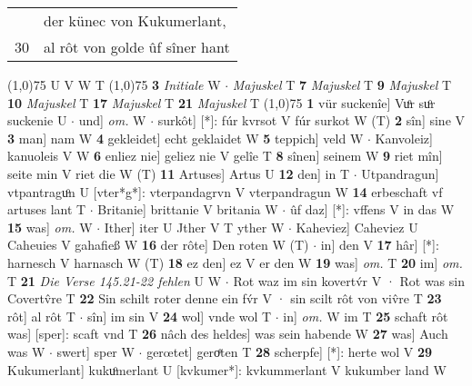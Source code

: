 \documentclass[8pt,a4paper,notitlepage]{article}
\begin{document}
\begin{table}[ht]
\begin{minipage}[t]{0.5\linewidth}
\begin{tabular}{rl}
 & der künec von Kukumerlant,\\ 
30 & al rôt von golde ûf sîner hant\\ 
\end{tabular}
\scriptsize
\line(1,0){75} \newline
U V W T \newline
\line(1,0){75} \newline
\textbf{3} \textit{Initiale} W   $\cdot$ \textit{Majuskel} T  \textbf{7} \textit{Majuskel} T  \textbf{9} \textit{Majuskel} T  \textbf{10} \textit{Majuskel} T  \textbf{17} \textit{Majuskel} T  \textbf{21} \textit{Majuskel} T  \newline
\line(1,0){75} \newline
\textbf{1} vür suckenîe] Vuͦr suͦr suckenie U  $\cdot$ und] \textit{om.} W  $\cdot$ surkôt] [*]: fúr kvrsot V fúr surkot W (T) \textbf{2} sîn] sine V \textbf{3} man] nam W \textbf{4} gekleidet] echt geklaidet W \textbf{5} teppich] veld W  $\cdot$ Kanvoleiz] kanuoleis V W \textbf{6} enliez nie] geliez nie V gelîe T \textbf{8} sînen] seinem W \textbf{9} riet mîn] seite min V riet die W (T) \textbf{11} Artuses] Artus U \textbf{12} den] in T  $\cdot$ Utpandragun] vtpantraguͦn U [vter*g*]: vterpandagrvn V vterpandragun W \textbf{14} erbeschaft vf artuses lant T  $\cdot$ Britanie] brittanie V britania W  $\cdot$ ûf daz] [*]: vffens V in das W \textbf{15} was] \textit{om.} W  $\cdot$ Ither] iter U Jther V T yther W  $\cdot$ Kaheviez] Caheviez U Caheuies V gahafieß W \textbf{16} der rôte] Den roten W (T)  $\cdot$ in] den V \textbf{17} hâr] [*]: harnesch V harnasch W (T) \textbf{18} ez den] ez V er den W \textbf{19} was] \textit{om.} T \textbf{20} im] \textit{om.} T \textbf{21} \textit{Die Verse 145.21-22 fehlen} U W   $\cdot$ Rot waz im sin kovertv́r V · Rot was sin Covertv̂re T \textbf{22} Sin schilt roter denne ein fv́r V · sin scilt rôt von viv̂re T \textbf{23} rôt] al rôt T  $\cdot$ sîn] im sin V \textbf{24} wol] vnde wol T  $\cdot$ in] \textit{om.} W im T \textbf{25} schaft rôt was] [sper]: scaft vnd T \textbf{26} nâch des heldes] was sein habende W \textbf{27} was] Auch was W  $\cdot$ swert] sper W  $\cdot$ gerœtet] geroͤten T \textbf{28} scherpfe] [*]: herte wol V \textbf{29} Kukumerlant] kukuͦmerlant U [kvkumer*]: kvkummerlant V kukumber land W \newline
\end{minipage}
\end{table}
\end{document}
